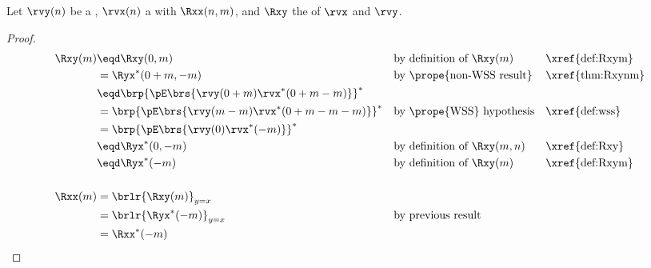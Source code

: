 \begin{corollary}
\label{cor:Rxx}
Let $\rvy(n)$ be a ,
    $\rvx(n)$    a  with  $\Rxx(n,m)$,
and $\Rxy$    the  of $\rvx$ and $\rvy$.
\end{corollary}
\begin{proof}
\begin{align*}
  \Rxy(m)
     &\eqd \Rxy(0,m)
     && \text{by definition of $\Rxy(m)$}
     && \text{\xref{def:Rxym}}
   \\&= \Ryx^\ast(0+m,-m)
     && \text{by \prope{non-WSS result}}
     && \text{\xref{thm:Rxynm}}
   \\&\eqd \brp{\pE\brs{\rvy(0+m) \rvx^\ast(0+m-m)}}^\ast
   \\&=    \brp{\pE\brs{\rvy(m-m) \rvx^\ast(0+m-m-m)}}^\ast
     && \text{by \prope{WSS} hypothesis}
     && \text{\xref{def:wss}}
   \\&=    \brp{\pE\brs{\rvy(0) \rvx^\ast(-m)}}^\ast
   \\&\eqd \Ryx^\ast(0,-m)
     && \text{by definition of $\Rxy(m,n)$}
     && \text{\xref{def:Rxy}}
   \\&\eqd \Ryx^\ast(-m)
     && \text{by definition of $\Rxy(m)$}
     && \text{\xref{def:Rxym}}
   \\
   \\
   \Rxx(m)
     &= \brlr{\Rxy(m)}_{y=x}
   \\&= \brlr{\Ryx^\ast(-m)}_{y=x}
     && \text{by previous result}
   \\&= \Rxx^\ast(-m)
\end{align*}
\end{proof}


